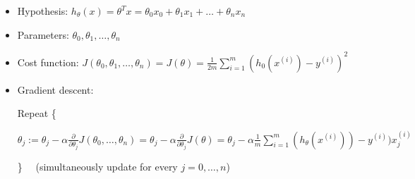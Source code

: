 \documentclass[a4paper]{report}
\begin{document}
      \begin{itemize}
        \item Hypothesis: $h_{\theta}(x) = \theta^{T}x = \theta_{0}x_{0} + \theta_{1}x_{1} + \ldots + \theta_{n}x_{n}$
        \item Parameters: $\theta_{0}, \theta_{1}, \ldots, \theta_{n}$
        \item Cost function: $J(\theta_{0}, \theta_{1}, \ldots, \theta_{n}) = J(\theta) = \frac{1}{2m}\sum_{i=1}^{m}(h_{0}(x^{(i)}) - y^{(i)})^{2}$
        \item Gradient descent:

            Repeat \{

                \hspace{1cm} $\theta_{j} := \theta_{j} - \alpha\frac{\partial}{\partial\theta_{j}}J(\theta_{0}, \ldots, \theta_{n}) = \theta_{j} - \alpha\frac{\partial}{\partial\theta_{j}}J(\theta) = \theta_{j} - \alpha\frac{1}{m}\sum_{i=1}^{m}(h_{\theta}(x^{(i)})) - y^{(i)})x^{(i)}_{j}$

            \} \ \ (simultaneously update for every $j = 0, \ldots, n$)
      \end{itemize}
\end{document}
